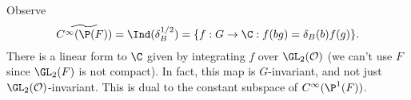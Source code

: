 \documentclass[a4paper]{article}
\begin{document}
\begin{eg}
  Observe
  \[
    \widetilde{C^\infty(\P(F))} = \Ind(\delta_B^{1/2}) = \{f: G \to \C: f(bg) = \delta_B(b) f(g)\}.
  \]
  There is a linear form to $\C$ given by integrating $f$ over $\GL_2(\mathcal{O})$ (we can't use $F$ since $\GL_2(F)$ is not compact). In fact, this map is $G$-invariant, and not just $\GL_2(\mathcal{O})$-invariant. This is dual to the constant subspace of $C^\infty(\P^1(F))$.
\end{eg}


\printindex
\end{document}
